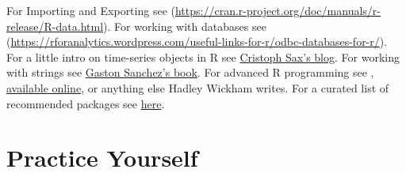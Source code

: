 \documentclass[]{book}
\theoremstyle{definition}
\theoremstyle{definition}
\theoremstyle{definition}
\theoremstyle{remark}
\begin{document}
For Importing and Exporting see
(\url{https://cran.r-project.org/doc/manuals/r-release/R-data.html}).
For working with databases see
(\url{https://rforanalytics.wordpress.com/useful-links-for-r/odbc-databases-for-r/}).
For a little intro on time-series objects in R see
\href{http://www.christophsax.com/2018/05/15/tsbox/}{Cristoph Sax's
blog}. For working with strings see
\href{http://www.gastonsanchez.com/r4strings/}{Gaston Sanchez's book}.
For advanced R programming see \citet{wickham2014advanced},
\href{http://adv-r.had.co.nz/}{available online}, or anything else
Hadley Wickham writes. For a curated list of recommended packages see
\href{https://github.com/rstudio/RStartHere/blob/master/README.md}{here}.

\section{Practice Yourself}\label{practice-yourself}
\end{document}
